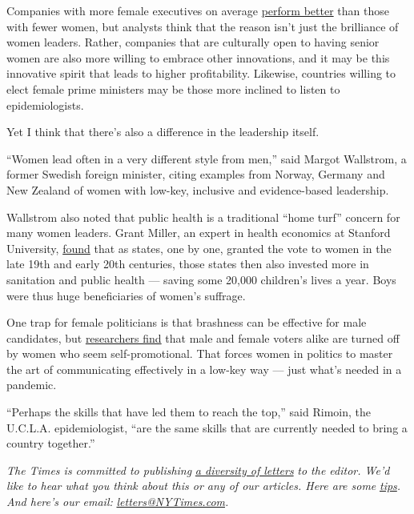 Companies with more female executives on average
\href{https://www.nytimes3xbfgragh.onion/2013/10/24/opinion/kristof-twitter-women-power.html}{perform
better} than those with fewer women, but analysts think that the reason
isn't just the brilliance of women leaders. Rather, companies that are
culturally open to having senior women are also more willing to embrace
other innovations, and it may be this innovative spirit that leads to
higher profitability. Likewise, countries willing to elect female prime
ministers may be those more inclined to listen to epidemiologists.

Yet I think that there's also a difference in the leadership itself.

``Women lead often in a very different style from men,'' said Margot
Wallstrom, a former Swedish foreign minister, citing examples from
Norway, Germany and New Zealand of women with low-key, inclusive and
evidence-based leadership.

Wallstrom also noted that public health is a traditional ``home turf''
concern for many women leaders. Grant Miller, an expert in health
economics at Stanford University,
\href{https://fsi.stanford.edu/news/when-it-comes-health-men-have-long-benefited-women-power}{found}
that as states, one by one, granted the vote to women in the late 19th
and early 20th centuries, those states then also invested more in
sanitation and public health --- saving some 20,000 children's lives a
year. Boys were thus huge beneficiaries of women's suffrage.

One trap for female politicians is that brashness can be effective for
male candidates, but
\href{https://www.nytimes3xbfgragh.onion/2008/02/10/opinion/10kristof.html}{researchers
find} that male and female voters alike are turned off by women who seem
self-promotional. That forces women in politics to master the art of
communicating effectively in a low-key way --- just what's needed in a
pandemic.

``Perhaps the skills that have led them to reach the top,'' said Rimoin,
the U.C.L.A. epidemiologist, ``are the same skills that are currently
needed to bring a country together.''

\emph{The Times is committed to publishing}
\href{https://www.nytimes3xbfgragh.onion/2019/01/31/opinion/letters/letters-to-editor-new-york-times-women.html}{\emph{a
diversity of letters}} \emph{to the editor. We'd like to hear what you
think about this or any of our articles. Here are some}
\href{https://help.nytimes3xbfgragh.onion/hc/en-us/articles/115014925288-How-to-submit-a-letter-to-the-editor}{\emph{tips}}\emph{.
And here's our email:}
\href{mailto:letters@NYTimes.com}{\emph{letters@NYTimes.com}}\emph{.}

